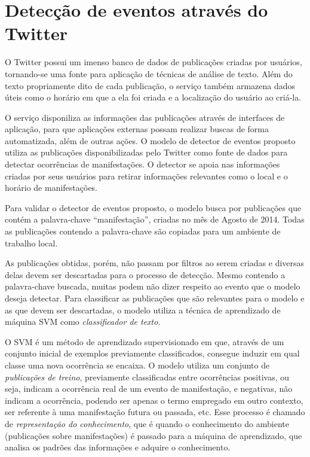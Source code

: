 \chapter{Detecção de eventos através do Twitter}

O Twitter possui um imenso banco de dados de publicações criadas por usuários, tornando-se uma fonte para aplicação de técnicas de análise de texto. Além do texto propriamente dito de cada publicação, o serviço também armazena dados úteis como o horário em que a ela foi criada e a localização do usuário ao criá-la.

O serviço disponiliza as informações das publicações através de interfaces de aplicação, para que aplicações externas possam realizar buscas de forma automatizada, além de outras ações. O modelo de detector de eventos proposto utiliza as publicações disponibilizadas pelo Twitter como fonte de dados para detectar ocorrências de manifestações. O detector se apoia nas informações criadas por seus usuários para retirar informações relevantes como o local e o horário de manifestações.

Para validar o detector de eventos proposto, o modelo busca por publicações que contém a palavra-chave ``manifestação'', criadas no mês de Agosto de 2014. Todas as publicações contendo a palavra-chave são copiadas para um ambiente de trabalho local. 

As publicações obtidas, porém, não passam por filtros ao serem criadas e diversas delas devem ser descartadas para o processo de detecção. Mesmo contendo a palavra-chave buscada, muitas podem não dizer respeito ao evento que o modelo deseja detectar. Para classificar as publicações que são relevantes para o modelo e as que devem ser descartadas, o modelo utiliza a técnica de aprendizado de máquina SVM como \textit{classificador de texto}. 

O SVM é um método de aprendizado supervisionado em que, através de um conjunto inicial de exemplos previamente classificados, consegue induzir em qual classe uma nova ocorrência se encaixa. O modelo utiliza um conjunto de \textit{publicações de treino}, previamente classificadas entre ocorrências positivas, ou seja, indicam a ocorrência real de um evento de manifestação, e negativas, não indicam a ocorrência, podendo ser apenas o termo empregado em outro contexto, ser referente à uma manifestação futura ou passada, etc. Esse processo é chamado de \textit{representação do conhecimento}, que é quando o conhecimento do ambiente (publicações sobre manifestações) é passado para a máquina de aprendizado, que analisa os padrões das informações e adquire o conhecimento.

